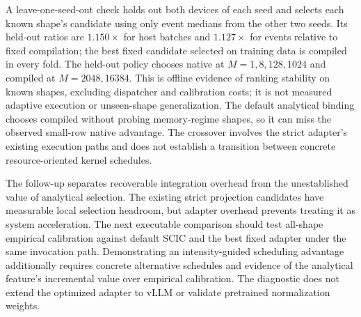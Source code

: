 A leave-one-seed-out check holds out both devices of each seed and selects each known shape's candidate using only event medians from the other two seeds. Its held-out ratios are $1.150\times$ for host batches and $1.127\times$ for events relative to fixed compilation; the best fixed candidate selected on training data is compiled in every fold. The held-out policy chooses native at $M=1,8,128,1024$ and compiled at $M=2048,16384$. This is offline evidence of ranking stability on known shapes, excluding dispatcher and calibration costs; it is not measured adaptive execution or unseen-shape generalization. The default analytical binding chooses compiled without probing memory-regime shapes, so it can miss the observed small-row native advantage. The crossover involves the strict adapter's existing execution paths and does not establish a transition between concrete resource-oriented kernel schedules.

The follow-up separates recoverable integration overhead from the unestablished value of analytical selection. The existing strict projection candidates have measurable local selection headroom, but adapter overhead prevents treating it as system acceleration. The next executable comparison should test all-shape empirical calibration against default SCIC and the best fixed adapter under the same invocation path. Demonstrating an intensity-guided scheduling advantage additionally requires concrete alternative schedules and evidence of the analytical feature's incremental value over empirical calibration. The diagnostic does not extend the optimized adapter to vLLM or validate pretrained normalization weights.
